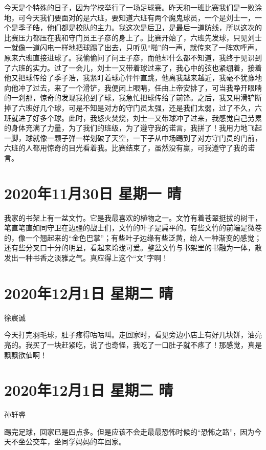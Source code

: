 今天是个特殊的日子，因为学校举行了一场足球赛。昨天和一班比赛我们是一败涂地，可今天我们要面对的是六班，要知道六班有两个魔鬼球员，一个是刘士一，一个是季子皓，他们都是校队的主力。我这次是后卫，是最后一道防线，所以这次的比赛压力都压在我和守门员王子彦的身上了。比赛开始了，六班先发球，只见刘士一就像一道闪电一样地把球踢了出去，只听见“啪”的一声，就传来了一阵欢呼声，原来六班直接进球了。我偷偷问了问王子彦，而他却什么都不知道，我终于见识到了六班的实力。过了一会儿，刘士一又带着球过来了，我心中的弦也紧绷着，接着他又把球传给了季子浩，我紧盯着球心怦怦直跳，他离我越来越近，我毫不犹豫地向他冲了过去，来了一个滑铲，我便闭上眼睛，任由上帝安排了，可当我睁开眼睛的一刹那，惊奇的发现我抢到了球，我急忙把球传给了前锋。之后，我又用滑铲断掉了六班好几个球，可是不知是对方的守门员太强，还是我们太弱，过了不久，六班就进了好多个球。此时，我怒火焚烧，刘士一又带球冲了过来，我感觉自己劳累的身体充满了力量，为了我们的班级，为了遵守我的诺言，我拼了！我用力地飞起一脚，球就像一颗子弹一样划破了天空，一下子从中场踢到了对方守门员的门前，六班的人都用惊奇的目光看着我。比赛结束了，虽然没有赢，可我遵守了我的诺言。

\section{2020年11月30日 星期一 晴}

我家的书架上有一盆文竹。它是我最喜欢的植物之一。文竹有着苍翠挺拔的树干，笔直笔直如同守卫在边疆的战士们，文竹的叶子是扁平的。有些文竹的前端是微卷的，像一个翘起来的“金色巴掌”；有些叶子边缘有些泛黄，给人一种渐变的感觉；还有些分叉口十分的明显，看起来玲珑可爱。整盆文竹与书架里的书融为一体，散发出一种书香之淡雅之气。真应得上这个“文”字啊！

\section{2020年12月1日 星期二 晴}

徐宸诚

今天打完羽毛球，肚子疼得咕咕叫。走回家时，看见旁边小店上有好几块饼，油亮亮的。我买了一块赶紧吃，说了也奇怪，我吃了一口肚子就不疼了！那感觉，真是飘飘欲仙啊！

\section{2020年12月1日 星期二 晴}

孙轩睿

踢完足球，回家已是四点多。但是应该不会走最最恐怖时候的“恐怖之路”，因为今天不坐公交车，坐同学妈妈的车回家。

